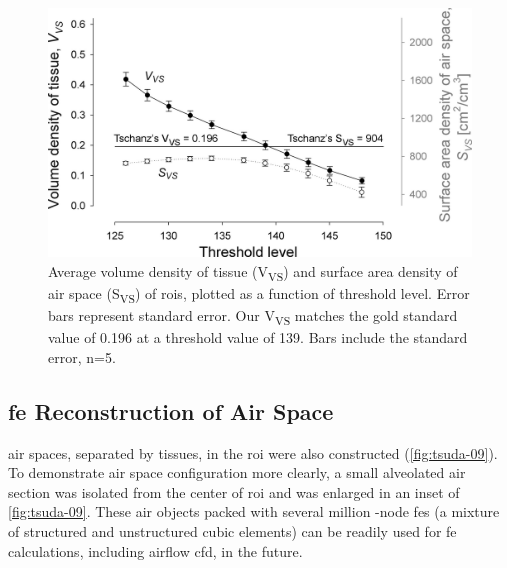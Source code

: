 \renewcommand{\imsize}{\linewidth}%
\begin{figure}[htb]%
	\centering
	\includegraphics[width=\imsize]{img/Tsuda2008/Tsuda-08}
	\caption[Tissue volume- and airspace surface area-density]{Average volume density of tissue (V\textsubscript{VS}) and surface area density of air space (S\textsubscript{VS}) of \acp{roi}, plotted as a function of threshold level. Error bars represent standard error. Our V\textsubscript{VS} matches the gold standard value of 0.196 at a threshold value of 139. Bars include the standard error, n=5.}
	\label{fig:VVSplot}
\end{figure}%

\subsection{\acs{fe} \threed Reconstruction of Air Space}
\threed air spaces, separated by tissues, in the \ac{roi} were also constructed (\autoref{fig:tsuda-09}). To demonstrate air space configuration more clearly, a small alveolated air section was isolated from the center of \ac{roi} and was enlarged in an inset of \autoref{fig:tsuda-09}. These \threed air objects packed with several million -node \acp{fe} (a mixture of structured and unstructured cubic elements) can be readily used for \ac{fe} calculations, including airflow \ac{cfd}, in the future.

